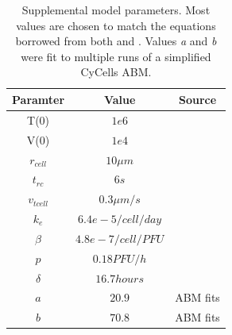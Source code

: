 \documentclass[10pt]{article}
\begin{document}
\begin{table}[!ht]
\begin{center}
\begin{tabular}{ | c | c | c | }
  \hline                        
  Paramter & Value & Source \\
  \hline
  T(0) & $1e6$ & \cite{Mitchell2011} \\
  V(0) &  $1e4$ & \cite{Mitchell2011} \\
  $r_{cell}$ &  $10 \mu m$ & \cite{Miao2010} \\
  $t_{rc}$ & $6s$ & \cite{Peters1983} \\
  $v_{tcell}$ & $0.3 \mu m/s$ & \cite{Miller2003} \\
  $k_e$ & $6.4e-5/cell/day$ & \cite{Miao2010} \\
  $\beta$ & $4.8e-7/cell/PFU$ & \cite{Mitchell2011} \\
  $p$ & $0.18 PFU/h$ & \cite{Mitchell2011} \\
  $\delta$ & $16.7 hours$ & \cite{Mitchell2011} \\
  $a$ & $20.9$ & ABM fits \\
  $b$ & $70.8$ & ABM fits \\
  \hline  
\end{tabular}
\caption{Supplemental model parameters.  Most values are chosen to match the equations borrowed from both \cite{Mitchell2011} and \cite{Miao2010}.  Values \textit{a} and \textit{b} were fit to multiple runs of a simplified CyCells ABM.}
\label{table:supplement}
\end{center}
\end{table}
\end{document}
